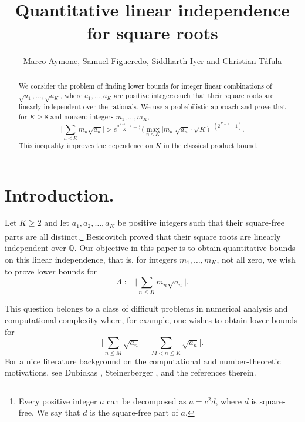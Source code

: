 \documentclass[reqno,12pt]{amsart}
\theoremstyle{remark}
\begin{document}
\title{Quantitative linear independence for square roots}
\author[M. Aymone, S. Figueredo, S. Iyer and C. T\'afula]{Marco Aymone, Samuel Figueredo, Siddharth Iyer and Christian T\'afula}

\begin{abstract}
We consider the problem of finding lower bounds for integer linear combinations of $\sqrt{a_1},\ldots,\sqrt{a_K}$, where $a_1,\ldots,a_K$ are positive integers such that their square roots are linearly independent over the rationals. We use a probabilistic approach and prove that for $K\geq 8$ and nonzero integers $m_1,\ldots,m_K$,
$$ \bigg|\sum_{n\leq K} m_n\sqrt{a_n}\bigg| > e^{\frac{2^{K-1}-1}{K} - \frac{1}{2}} \bigg(\max_{n\leq K}|m_n|\sqrt{a_n}\cdot \sqrt{K}\bigg)^{-(2^{K-1}-1)}. $$
This inequality improves the dependence on $K$ in the classical product bound.
\end{abstract}

\maketitle

\section{Introduction.}
 Let $K\geq 2$ and let $a_1,a_2,\ldots,a_K$ be positive integers such that their square-free parts are all distinct.\footnote{Every positive integer $a$ can be decomposed as $a=c^2d$, where $d$ is square-free. We say that $d$ is the square-free part of $a$.} Besicovitch \cite{besicovitch_LI} proved that their square roots are linearly independent over $\mathbb{Q}$. Our objective in this paper is to obtain quantitative bounds on this linear independence, that is, for integers $m_1,\ldots,m_K$, not all zero, we wish to prove lower bounds for 
\begin{equation}\label{equation Lambda}
\Lambda:=\bigg|\sum_{n\leq K}m_n\sqrt{a_n}\bigg|.    
\end{equation}

This question belongs to a class of difficult problems in numerical analysis and computational complexity where, for example, one wishes to obtain lower bounds for
$$\bigg|\sum_{n\leq M}\sqrt{a_n}-\sum_{M<n\leq K}\sqrt{a_n}\bigg|.$$
For a nice literature background on the computational and number-theoretic motivations, see Dubickas \cite{Dubickas_square_roots}, Steinerberger \cite{steinerberger_square_roots}, and the references therein.
\end{document}
